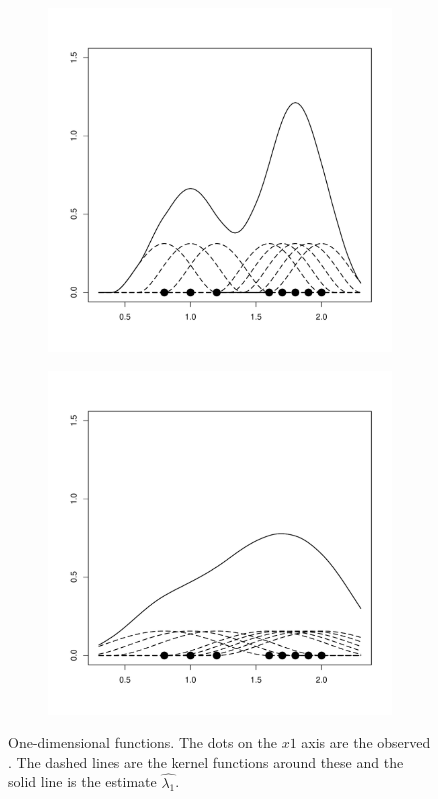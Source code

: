\begin{figure}[htbp]
\begin{subfigure}[t]{0.32\textwidth}
        \includegraphics[width=\textwidth]{img/kernel1d-04}
        \label{fig:theory:kernel1d:04}
    \end{subfigure}
    \begin{subfigure}[t]{0.32\textwidth}
        \includegraphics[width=\textwidth]{img/kernel1d-08}
        \label{fig:theory:kernel1d:08}
    \end{subfigure}
    \caption{One-dimensional  functions. The dots on the $x1$ axis are the observed . The dashed lines are the kernel functions around these  and the solid line is the  estimate $\hat{\lambda_1}$.}
    \label{fig:theory:kernel1d}
\end{figure}

